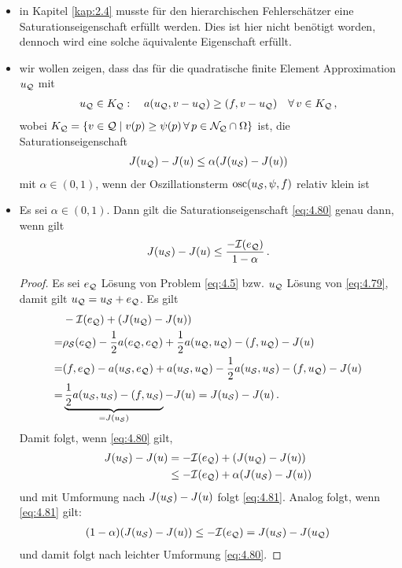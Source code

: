 \begin{itemize}
\item in Kapitel \ref{kap:2.4} musste für den hierarchischen Fehlerschätzer eine Saturationseigenschaft erfüllt werden. Dies ist hier nicht benötigt worden, dennoch wird eine solche äquivalente Eigenschaft erfüllt.

\item wir wollen zeigen, dass das für die quadratische finite Element Approximation $u_{\mathcal Q}$ mit
\begin{align}\label{eq:4.79}
	u_{\mathcal Q} \in K_{\mathcal Q} : \quad a(u_{\mathcal Q}, v-u_{\mathcal Q}) \ge (f,v-u_{\mathcal Q}) \quad \forall \, v \in K_{\mathcal Q} \, ,
\end{align}
wobei $K_{\mathcal Q} = \{v \in \mathcal Q \mid v(p)\ge \psi(p) \, \forall \, p \in \mathcal N_{\mathcal Q} \cap \Omega\}$ ist, die Saturationseigenschaft
\begin{align}\label{eq:4.80}
	J(u_{\mathcal Q})-J(u) \le \alpha (J(u_{\mathcal S})-J(u))
\end{align}
mit $\alpha \in (0,1)$, wenn der Oszillationsterm $\operatorname{osc} (u_{\mathcal S},\psi,f)$ relativ klein ist

\item
\begin{lemma}\label{lem:4.26}
Es sei $\alpha \in (0,1)$. Dann gilt die Saturationseigenschaft \eqref{eq:4.80} genau dann, wenn gilt
\begin{align}\label{eq:4.81}
	J(u_{\mathcal S}) - J(u) \le \frac{-\mathcal I (e_{\mathcal Q})}{1-\alpha} \, .
\end{align}
\end{lemma}

\begin{proof}
Es sei $e_{\mathcal Q}$ Lösung von Problem \eqref{eq:4.5} bzw. $u_{\mathcal Q}$ Lösung von \eqref{eq:4.79}, damit gilt $u_{\mathcal Q} = u_{\mathcal S} + e_{\mathcal Q}$. Es gilt
\begin{align*}
	& -\mathcal I(e_{\mathcal Q}) + (J(u_{\mathcal Q})-J(u))  \\
	 = & \rho_{\mathcal S}(e_{\mathcal Q})-\frac 12 a(e_{\mathcal Q},e_{\mathcal Q}) + \frac 12 a(u_{\mathcal Q},u_{\mathcal Q})-(f,u_{\mathcal Q})-J(u) \\
	 = & (f,e_{\mathcal Q})-a(u_{\mathcal S},e_{\mathcal Q})+a(u_{\mathcal S},u_{\mathcal Q})-\frac 12 a(u_{\mathcal S},u_{\mathcal S})-(f,u_{\mathcal Q})- J(u) \\
	 = & \underbrace{\frac 1 2 a(u_{\mathcal S},u_{\mathcal S}) - (f,u_{\mathcal S})}_{=J(u_{\mathcal S})} - J(u) = J(u_{\mathcal S})-J(u) \, .
\end{align*}
Damit folgt, wenn \eqref{eq:4.80} gilt,
\begin{align*}
	J(u_{\mathcal S})-J(u) &= -\mathcal I (e_{\mathcal Q}) + (J(u_{\mathcal Q})-J(u)) \\
	& \le -\mathcal I(e_{\mathcal Q}) + \alpha (J(u_{\mathcal S})-J(u))
\end{align*}
und mit Umformung nach $J(u_{\mathcal S})-J(u)$ folgt \eqref{eq:4.81}. Analog folgt, wenn \eqref{eq:4.81} gilt:
\begin{align*}
	(1-\alpha)(J(u_{\mathcal S}) - J(u)) \le -\mathcal I (e_{\mathcal Q}) = J(u_{\mathcal S})-J(u_{\mathcal Q}) 
\end{align*}
und damit folgt nach leichter Umformung \eqref{eq:4.80}.
\end{proof}


\end{itemize}

